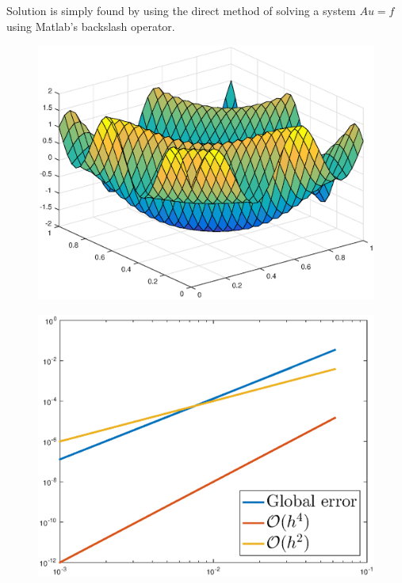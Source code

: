 \documentclass[main.tex]{subfiles}
\begin{document}
Solution is simply found by using the direct method of solving a system $A u = f$ using Matlab's backslash operator.

\begin{figure}[h]
\centering
\begin{minipage}{.45\textwidth}
  \centering
  \includegraphics[width=.9\linewidth]{../Figures/ex2u0calc}
  \label{fig:ex2:u0calc}
\end{minipage}\hfill%
\begin{minipage}{.45\textwidth}
  \centering
  \includegraphics[width=.9\linewidth]{../Figures/ex2u0err}
  \label{fig:ex2:u0err}
\end{minipage}
\end{figure}
\end{document}
